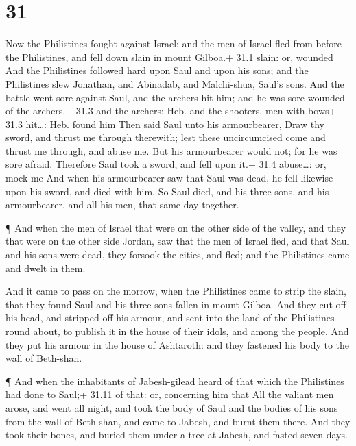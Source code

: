 \hypertarget{section-30}{%
\section{31}\label{section-30}}

 Now the Philistines fought against Israel: and the men of
Israel fled from before the Philistines, and fell down slain in mount
Gilboa.+ 31.1 slain: or, wounded  And the Philistines
followed hard upon Saul and upon his sons; and the Philistines slew
Jonathan, and Abinadab, and Malchi-shua, Saul's sons.  And
the battle went sore against Saul, and the archers hit him; and he was
sore wounded of the archers.+ 31.3 and the archers: Heb. and the
shooters, men with bows+ 31.3 hit\ldots: Heb. found him 
Then said Saul unto his armourbearer, Draw thy sword, and thrust me
through therewith; lest these uncircumcised come and thrust me through,
and abuse me. But his armourbearer would not; for he was sore afraid.
Therefore Saul took a sword, and fell upon it.+ 31.4 abuse\ldots: or,
mock me  And when his armourbearer saw that Saul was dead,
he fell likewise upon his sword, and died with him.  So Saul
died, and his three sons, and his armourbearer, and all his men, that
same day together.

 ¶ And when the men of Israel that were on the other side of
the valley, and they that were on the other side Jordan, saw that the
men of Israel fled, and that Saul and his sons were dead, they forsook
the cities, and fled; and the Philistines came and dwelt in them.

 And it came to pass on the morrow, when the Philistines
came to strip the slain, that they found Saul and his three sons fallen
in mount Gilboa.  And they cut off his head, and stripped
off his armour, and sent into the land of the Philistines round about,
to publish it in the house of their idols, and among the people.
 And they put his armour in the house of Ashtaroth: and
they fastened his body to the wall of Beth-shan.

 ¶ And when the inhabitants of Jabesh-gilead heard of that
which the Philistines had done to Saul;+ 31.11 of that: or, concerning
him that  All the valiant men arose, and went all night,
and took the body of Saul and the bodies of his sons from the wall of
Beth-shan, and came to Jabesh, and burnt them there.  And
they took their bones, and buried them under a tree at Jabesh, and
fasted seven days.
